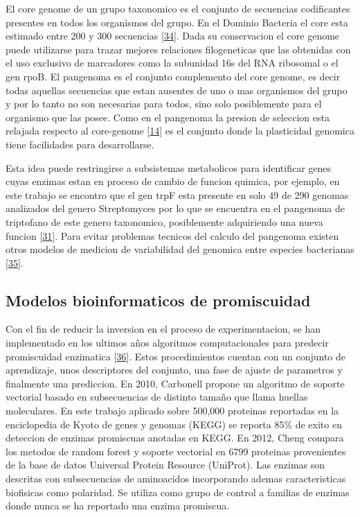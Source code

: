 \documentclass[12pt,twoside]{reedthesis}
\begin{document}
  El core genome de un grupo taxonomico es el conjunto de secuencias
  codificantes presentes en todos los organismos del grupo. En el Dominio
  Bacteria el core esta estimado entre 200 y 300 secuencias
  {[}\protect\hyperlink{ref-halachev_calculating_2011}{34}{]}. Dada su
  conservacion el core genome puede utilizarse para trazar mejores
  relaciones filogeneticas que las obtenidas con el uso exclusivo de
  marcadores como la subunidad 16s del RNA ribosomal o el gen rpoB. El
  pangenoma es el conjunto complemento del core genome, es decir todas
  aquellas secuencias que estan ausentes de uno o mas organismos del grupo
  y por lo tanto no son necesarias para todos, sino solo posiblemente para
  el organismo que las posee. Como en el pangenoma la presion de seleccion
  esta relajada respecto al core-genome
  {[}\protect\hyperlink{ref-firn_darwinian_2009}{14}{]} es el conjunto
  donde la plasticidad genomica tiene facilidades para desarrollarse.
  
  Esta idea puede restringirse a subsistemas metabolicos para identificar
  genes cuyas enzimas estan en proceso de cambio de funcion quimica, por
  ejemplo, en este trabajo se encontro que el gen trpF esta presente en
  solo 49 de 290 genomas analizados del genero Streptomyces por lo que se
  encuentra en el pangenoma de triptofano de este genero taxonomico,
  posiblemente adquiriendo una nueva funcion
  {[}\protect\hyperlink{ref-ma_unconventional_2013}{31}{]}. Para evitar
  problemas tecnicos del calculo del pangenoma existen otros modelos de
  medicion de variabilidad del genomica entre especies bacterianas
  {[}\protect\hyperlink{ref-kislyuk_genomic_2011}{35}{]}.
  
  \subsection{Modelos bioinformaticos de
  promiscuidad}\label{modelos-bioinformaticos-de-promiscuidad}
  
  Con el fin de reducir la inversion en el proceso de experimentacion, se
  han implementado en los ultimos años algoritmos computacionales para
  predecir promiscuidad enzimatica
  {[}\protect\hyperlink{ref-carbonell_molecular_2010}{36}{]}. Estos
  procedimientos cuentan con un conjunto de aprendizaje, unos descriptores
  del conjunto, una fase de ajuste de parametros y finalmente una
  prediccion. En 2010, Carbonell propone un algoritmo de soporte vectorial
  basado en subsecuencias de distinto tamaño que llama huellas
  moleculares. En este trabajo aplicado sobre 500,000 proteinas reportadas
  en la enciclopedia de Kyoto de genes y genomas (KEGG) se reporta 85\% de
  exito en deteccion de enzimas promiscuas anotadas en KEGG. En 2012,
  Cheng compara los metodos de random forest y soporte vectorial en 6799
  proteinas provenientes de la base de datos Universal Protein Resource
  (UniProt). Las enzimas son descritas con subsecuencias de aminoacidos
  incorporando ademas caracteristicas biofisicas como polaridad. Se
  utiliza como grupo de control a familias de enzimas donde nunca se ha
  reportado una enzima promiscua.
  
\end{document}
